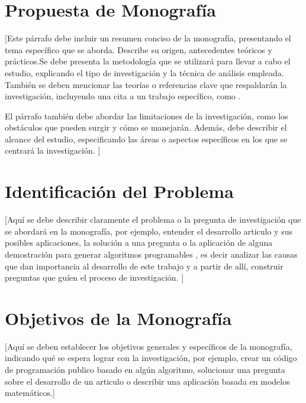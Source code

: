 \documentclass[12pt,twoside,letterpaper]{article}
\begin{document}







\section{Propuesta de Monografía}
[Este párrafo debe incluir un resumen conciso de la monografía, presentando el tema específico que se aborda. Describe su origen, antecedentes teóricos y prácticos.Se debe presenta la metodología que se utilizará para llevar a cabo el estudio, explicando el tipo de investigación y la técnica de análisis empleada. También se deben mencionar las teorías o referencias clave que respaldarán la investigación, incluyendo una cita a un trabajo específico, como \cite{Ejemplo}.

El párrafo también debe abordar las limitaciones de la investigación, como los obstáculos que pueden surgir y cómo se manejarán. Además, debe describir el alcance del estudio, especificando las áreas o aspectos específicos en los que se centrará la investigación. ]

\section{Identificación del Problema}
[Aquí se debe describir claramente el problema o la pregunta de investigación que se abordará en la monografía, por ejemplo, entender el desarrollo articulo y sus posibles aplicaciones, la solución a una pregunta o la aplicación de alguna demostración para generar algoritmos programables , es decir analizar las causas que dan importancia al desarrollo de este trabajo y a partir de allí, construir preguntas que guíen el proceso de
investigación. ]

\section{Objetivos de la Monografía}

[Aquí se deben establecer los objetivos generales y específicos de la monografía, indicando qué se espera lograr con la investigación, por ejemplo, crear un código de programación publico basado en algún algoritmo, solucionar una pregunta sobre el desarrollo de un articulo o describir una aplicación basada en modelos matemáticos.]
\end{document}

